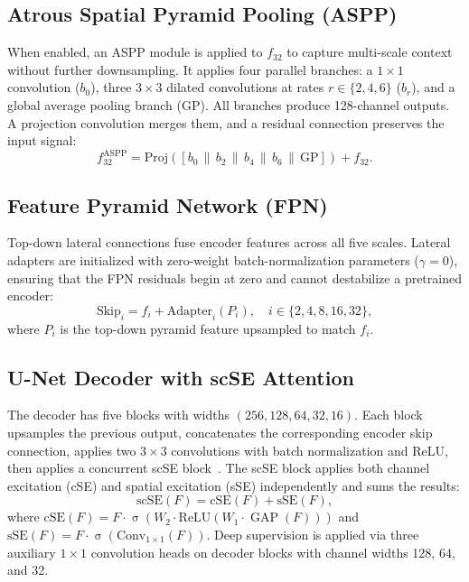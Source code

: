 \documentclass[journal]{IEEEtran}
\DeclareMathOperator{\GAP}{GAP}
\DeclareMathOperator{\sigmoid}{\sigma}
\begin{document}
\subsection{Atrous Spatial Pyramid Pooling (ASPP)}
When enabled, an ASPP module is applied to $f_{32}$ to capture multi-scale
context without further downsampling. It applies four parallel branches:
a $1{\times}1$ convolution ($b_0$), three $3{\times}3$ dilated convolutions
at rates $r \in \{2, 4, 6\}$ ($b_r$), and a global average pooling branch
(GP). All branches produce 128-channel outputs. A projection convolution
merges them, and a residual connection preserves the input signal:
\begin{equation}
  f_{32}^{\text{ASPP}} = \text{Proj}([b_0 \,\|\, b_2 \,\|\, b_4 \,\|\, b_6 \,\|\, \text{GP}]) + f_{32}.
  \label{eq:aspp}
\end{equation}

\subsection{Feature Pyramid Network (FPN)}
Top-down lateral connections fuse encoder features across all five scales.
Lateral adapters are initialized with zero-weight batch-normalization
parameters ($\gamma = 0$), ensuring that the FPN residuals begin at zero
and cannot destabilize a pretrained encoder:
\begin{equation}
  \text{Skip}_i = f_i + \text{Adapter}_i(P_i), \quad i \in \{2,4,8,16,32\},
  \label{eq:fpn}
\end{equation}
where $P_i$ is the top-down pyramid feature upsampled to match $f_i$.

\subsection{U-Net Decoder with scSE Attention}
The decoder has five blocks with widths $(256, 128, 64, 32, 16)$. Each block
upsamples the previous output, concatenates the corresponding encoder skip
connection, applies two $3{\times}3$ convolutions with batch normalization
and ReLU, then applies a concurrent scSE block~\cite{roy2019concurrent}.
The scSE block applies both channel excitation (cSE) and spatial excitation
(sSE) independently and sums the results:
\begin{equation}
  \text{scSE}(F) = \text{cSE}(F) + \text{sSE}(F),
  \label{eq:scse}
\end{equation}
where
$\text{cSE}(F) = F \cdot \sigmoid(W_2 \cdot \text{ReLU}(W_1 \cdot \GAP(F)))$
and $\text{sSE}(F) = F \cdot \sigmoid(\text{Conv}_{1\times1}(F))$.
Deep supervision is applied via three auxiliary $1{\times}1$ convolution
heads on decoder blocks with channel widths 128, 64, and 32.
\end{document}
